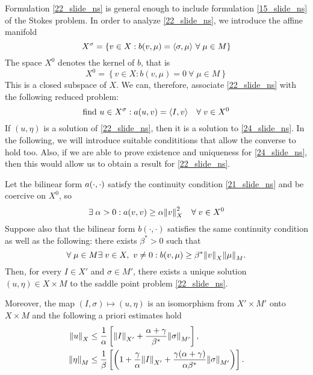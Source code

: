 Formulation \eqref{22_slide_ns} is general enough to include formulation \eqref{15_slide_ns} of the Stokes problem. In order to analyze \eqref{22_slide_ns}, we introduce the affine manifold 
\begin{equation}
    X^\sigma = \left\{ v \in X : b(v, \mu) = \langle \sigma,\mu \rangle \ \forall \; \mu \in M\right\}
    \label{23_slide_ns}
\end{equation}
The space \(X^0\) denotes the kernel of \(b\), that is 
\[
    X^0 = \left\{ v \in X : b(v,\mu) = 0 \ \forall \; \mu \in M \right\}
\]
This is a closed subspace of \(X\). We can, therefore, associate \eqref{22_slide_ns} with the following reduced problem:
\begin{equation}
    \text{find } u \in X^\sigma : a(u,v) =\langle I,v \rangle \quad \forall \; v \in X^0
    \label{24_slide_ns}
\end{equation}
If \((u,\eta)\) is a solution of \eqref{22_slide_ns}, then it is a solution to \eqref{24_slide_ns}. In the following, we will introduce suitable condititions that allow the converse to hold too. Also, if we are able to prove existence and uniqueness for \eqref{24_slide_ns}, then this would allow us to obtain a result for \eqref{22_slide_ns}. 
\begin{theorem}
    Let the bilinear form \(a(\cdot, \cdot)\) satisfy the continuity condition \eqref{21_slide_ns} and be coercive on \(X^0\), so 
    \begin{equation}
        \exists \; \alpha > 0 : a(v,v) \geq \alpha \norm{v}_X^2 \quad \forall \; v \in X^0
        \label{25_slide_ns}
    \end{equation}
    Suppose also that the bilinear form \(b(\cdot,\cdot)\) satisfies the same continuity condition as well as the following: there exists \(\beta^* > 0\) such that 
    \begin{equation}
        \forall \; \mu \in M \exists \; v \in X, \ v\neq 0 : b(v,\mu) \geq \beta^*\norm{v}_X\norm{\mu}_M.
        \label{26_slide_ns}
    \end{equation}
    Then, for every \(I \in X'\) and \(\sigma \in M'\), there exists a unique solution \((u,\eta)\in X \times M\) to the saddle point problem \eqref{22_slide_ns}.

    Moreover, the map \((I, \sigma) \mapsto (u, \eta)\) is an isomorphism from \(X' \times M'\) onto \(X \times M\) and the following a priori estimates hold 
    \begin{equation}
        \begin{aligned}
            \norm{u}_X &\leq \frac{1}{\alpha} \left[ \norm{I}_{X'} + \frac{\alpha + \gamma}{\beta^*} \norm{\sigma}_{M'} \right], \\
            \norm{\eta}_M &\leq \frac{1}{\beta} \left[ \left( 1+\frac{\gamma}{\alpha} \norm{I}_{X'}+ \frac{\gamma(\alpha+\gamma)}{\alpha \beta^*} \norm{\sigma}_{M'} \right) \right].
            \label{27_slide_ns}
        \end{aligned}
    \end{equation}
    \label{uniqueness_continuous}
\end{theorem}
